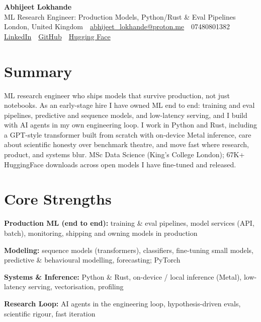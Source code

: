 \documentclass[10pt,a4paper]{article}
\newcommand{\sep}{\,\textcolor{accent!60}{\textbar}\,}
\begin{document}
\begin{center}
  {\fontsize{24}{26}\selectfont\bfseries Abhijeet Lokhande}\\[3pt]
  {\color{accent}\large ML Research Engineer: Production Models, Python/Rust \& Eval Pipelines}\\[5pt]
  {\small
    London, United Kingdom \sep
    \href{mailto:abhijeet_lokhande@proton.me}{abhijeet\_lokhande@proton.me} \sep
    07480801382 \\[2pt]
    \href{https://www.linkedin.com/in/ablds/}{LinkedIn} \sep
    \href{https://github.com/abhijeetscode}{GitHub} \sep
    \href{https://huggingface.co/ab-ai}{Hugging Face}
  }
\end{center}
\vspace{2pt}

\section{Summary}
ML research engineer who ships models that survive production, not just notebooks. As an early-stage hire I have owned ML end to end: training and eval pipelines, predictive and sequence models, and low-latency serving, and I build with AI agents in my own engineering loop. I work in Python and Rust, including a GPT-style transformer built from scratch with on-device Metal inference, care about scientific honesty over benchmark theatre, and move fast where research, product, and systems blur. MSc Data Science (King's College London); 67K+ HuggingFace downloads across open models I have fine-tuned and released.

\section{Core Strengths}
\begin{tight}
  \item[\textcolor{accent}{\small$\bullet$}] \textbf{Production ML (end to end):} training \& eval pipelines, model services (API, batch), monitoring, shipping and owning models in production
  \item[\textcolor{accent}{\small$\bullet$}] \textbf{Modeling:} sequence models (transformers), classifiers, fine-tuning small models, predictive \& behavioural modelling, forecasting; PyTorch
  \item[\textcolor{accent}{\small$\bullet$}] \textbf{Systems \& Inference:} Python \& Rust, on-device / local inference (Metal), low-latency serving, vectorisation, profiling
  \item[\textcolor{accent}{\small$\bullet$}] \textbf{Research Loop:} AI agents in the engineering loop, hypothesis-driven evals, scientific rigour, fast iteration
\end{tight}
\end{document}
